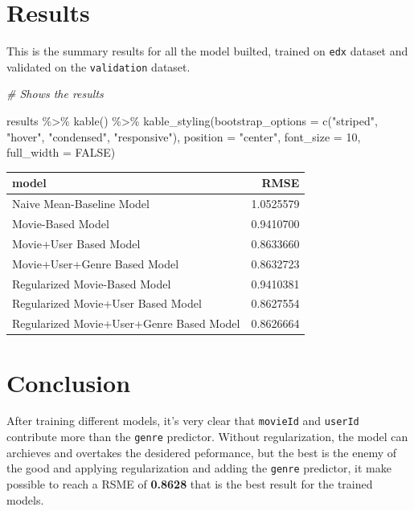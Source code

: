 \documentclass[
]{article}
\newenvironment{Shaded}{}{}
\newcommand{\AttributeTok}[1]{\textcolor[rgb]{0.49,0.56,0.16}{#1}}
\newcommand{\CommentTok}[1]{\textcolor[rgb]{0.38,0.63,0.69}{\textit{#1}}}
\newcommand{\ConstantTok}[1]{\textcolor[rgb]{0.53,0.00,0.00}{#1}}
\newcommand{\DecValTok}[1]{\textcolor[rgb]{0.25,0.63,0.44}{#1}}
\newcommand{\FunctionTok}[1]{\textcolor[rgb]{0.02,0.16,0.49}{#1}}
\newcommand{\NormalTok}[1]{#1}
\newcommand{\SpecialCharTok}[1]{\textcolor[rgb]{0.25,0.44,0.63}{#1}}
\newcommand{\StringTok}[1]{\textcolor[rgb]{0.25,0.44,0.63}{#1}}
\begin{document}
\hypertarget{results}{%
\section{Results}\label{results}}

This is the summary results for all the model builted, trained on
\texttt{edx} dataset and validated on the \texttt{validation} dataset.

\begin{Shaded}
\begin{Highlighting}[]
\CommentTok{\# Shows the results}

\NormalTok{results }\SpecialCharTok{\%\textgreater{}\%} 
   \FunctionTok{kable}\NormalTok{() }\SpecialCharTok{\%\textgreater{}\%}
   \FunctionTok{kable\_styling}\NormalTok{(}\AttributeTok{bootstrap\_options =} \FunctionTok{c}\NormalTok{(}\StringTok{"striped"}\NormalTok{, }\StringTok{"hover"}\NormalTok{, }\StringTok{"condensed"}\NormalTok{, }\StringTok{"responsive"}\NormalTok{),}
             \AttributeTok{position =} \StringTok{"center"}\NormalTok{,}
             \AttributeTok{font\_size =} \DecValTok{10}\NormalTok{,}
             \AttributeTok{full\_width =} \ConstantTok{FALSE}\NormalTok{)}
\end{Highlighting}
\end{Shaded}

\begin{table}
\centering\begingroup\fontsize{10}{12}\selectfont

\begin{tabular}{l|r}
\hline
model & RMSE\\
\hline
Naive Mean-Baseline Model & 1.0525579\\
\hline
Movie-Based Model & 0.9410700\\
\hline
Movie+User Based Model & 0.8633660\\
\hline
Movie+User+Genre Based Model & 0.8632723\\
\hline
Regularized Movie-Based Model & 0.9410381\\
\hline
Regularized Movie+User Based Model & 0.8627554\\
\hline
Regularized Movie+User+Genre Based Model & 0.8626664\\
\hline
\end{tabular}
\endgroup{}
\end{table}

\hypertarget{conclusion}{%
\section{Conclusion}\label{conclusion}}

After training different models, it's very clear that \texttt{movieId}
and \texttt{userId} contribute more than the \texttt{genre} predictor.
Without regularization, the model can archieves and overtakes the
desidered peformance, but the best is the enemy of the good and applying
regularization and adding the \texttt{genre} predictor, it make possible
to reach a RSME of \textbf{0.8628} that is the best result for the
trained models.
\end{document}
